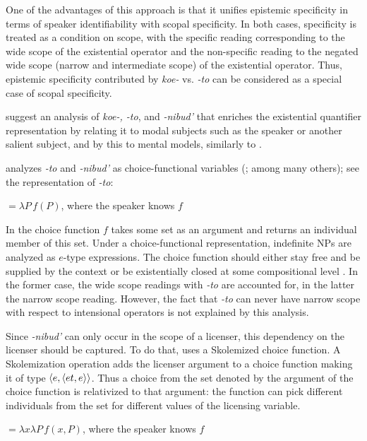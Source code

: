 \documentclass[output=paper,colorlinks,citecolor=brown]{langscibook}
\begin{document}
One of the advantages of this approach is that it unifies epistemic specificity in terms of speaker identifiability with scopal specificity. In both cases, specificity is treated as a condition on scope, with the specific reading corresponding to the wide scope of the existential operator and the non-specific reading to the negated wide scope (narrow and intermediate scope) of the existential operator. Thus, epistemic specificity contributed by \textit{koe-} vs. \textit{-to} can be considered as a special case of scopal specificity. 

\citet{Gorishneva.Zimmermann2011} suggest an analysis of \textit{koe-, -to}, and \textit{-nibud’} that enriches the existential quantifier representation by relating it to modal subjects such as the speaker or another salient subject, and by this to mental models, similarly to \citet{Kagan2011}.

\citet{Yanovich2005} analyzes \textit{-to} and \textit{-nibud’} as choice-functional variables (\citealt{Kratzer1998}; among many others); see the representation of \textit{-to}:

\ea {}${}=\lambda P\,f(P)$, where the speaker knows $f$\hfill\citep[320]{Yanovich2005}\label{geist:ex:yanovich}
\z

\noindent In  the choice function $f$ takes some set as an argument and returns an individual member of this set. Under a choice-functional representation, indefinite NPs are analyzed as $e$-type expressions. The choice function should either stay free and be supplied by the context \citep{Kratzer1998} or be existentially closed at some compositional level \citep{Reinhart1997}. In the former case, the wide scope readings with \textit{-to} are accounted for, in the latter the narrow scope reading. However, the fact that \textit{-to} can never have narrow scope with respect to intensional operators is not explained by this analysis.

Since \textit{-nibud’} can only occur in the scope of a licenser, this dependency on the licenser should be captured. To do that, \citeauthor{Yanovich2005} uses a Skolemized choice function. A Skolemization operation adds the licenser argument to a choice function making it of type $\langle{e,\langle{et,e}\rangle}\rangle$. Thus a choice from the set denoted by the argument of the choice function is relativized to that argument: the function can pick different individuals from the set for different values of the licensing variable.\largerpage

\ea {}${}=\lambda x\lambda P\,f(x,P)$, where the speaker knows $f$\\\hfill\citep[316]{Yanovich2005}\label{geist:ex:yanovich2}
\z
\end{document}
